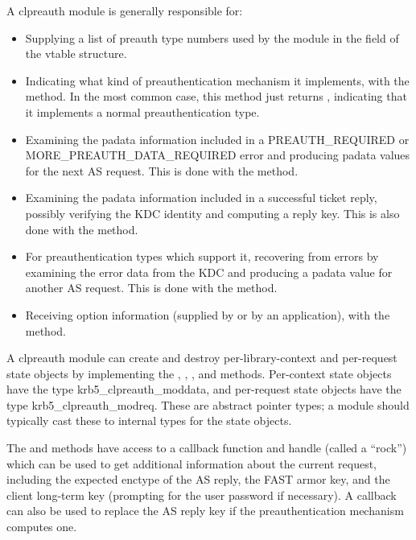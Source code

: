 \documentclass[letterpaper,10pt,english]{sphinxmanual}
\begin{document}
A clpreauth module is generally responsible for:
\begin{itemize}
\item {} 
Supplying a list of preauth type numbers used by the module in the
 field of the vtable structure.

\item {} 
Indicating what kind of preauthentication mechanism it implements,
with the  method.  In the most common case, this method
just returns , indicating that it implements a normal
preauthentication type.

\item {} 
Examining the padata information included in a PREAUTH\_REQUIRED or
MORE\_PREAUTH\_DATA\_REQUIRED error and producing padata values for the
next AS request.  This is done with the  method.

\item {} 
Examining the padata information included in a successful ticket
reply, possibly verifying the KDC identity and computing a reply
key.  This is also done with the  method.

\item {} 
For preauthentication types which support it, recovering from errors
by examining the error data from the KDC and producing a padata
value for another AS request.  This is done with the 
method.

\item {} 
Receiving option information (supplied by  or by an
application), with the  method.

\end{itemize}

A clpreauth module can create and destroy per-library-context and
per-request state objects by implementing the , ,
, and  methods.  Per-context state
objects have the type krb5\_clpreauth\_moddata, and per-request state
objects have the type krb5\_clpreauth\_modreq.  These are abstract
pointer types; a module should typically cast these to internal
types for the state objects.

The  and  methods have access to a callback
function and handle (called a “rock”) which can be used to get
additional information about the current request, including the
expected enctype of the AS reply, the FAST armor key, and the client
long-term key (prompting for the user password if necessary).  A
callback can also be used to replace the AS reply key if the
preauthentication mechanism computes one.
\end{document}
